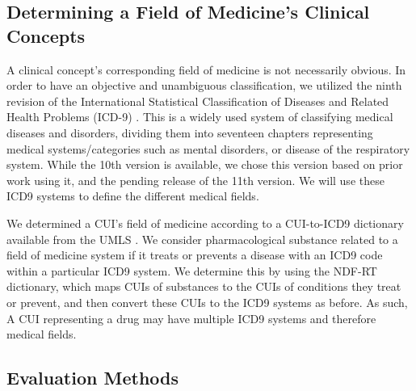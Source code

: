 \documentclass[11pt,a4paper]{article}
\begin{document}
\subsection{Determining a Field of Medicine's Clinical Concepts}
A clinical concept's corresponding field of medicine is not necessarily obvious. In order to have an objective and unambiguous classification, we utilized the ninth revision of the International Statistical Classification of Diseases and Related Health Problems (ICD-9) \cite{sleeInternationalClassificationDiseases1978}. This is a widely used system of classifying medical diseases and disorders, dividing them into seventeen chapters representing medical systems/categories such as mental disorders, or disease of the respiratory system. While the 10th version is available, we chose this version based on prior work using it, and the pending release of the 11th version. We will use these ICD9 systems to define the different medical fields. 

We determined a CUI's field of medicine according to a CUI-to-ICD9 dictionary available from the UMLS \cite{bodenreiderUnifiedMedicalLanguage2004}. We consider pharmacological substance related to a field of medicine system if it treats or prevents a disease with an ICD9 code within a particular ICD9 system. We determine this by using the NDF-RT dictionary, which maps CUIs of substances to the CUIs of conditions they treat or prevent, and then convert these CUIs to the ICD9 systems as before.  As such, A CUI representing a drug may have multiple ICD9 systems and therefore medical fields. 

\subsection{Evaluation Methods}
\end{document}
